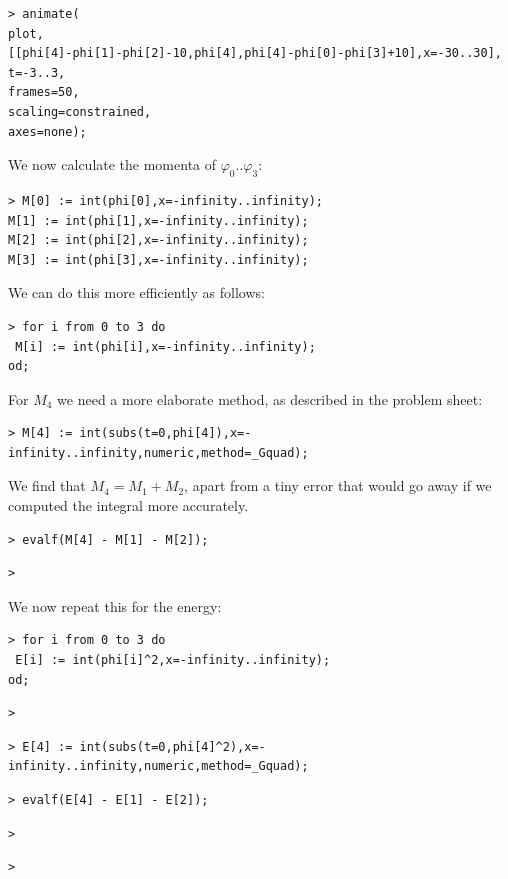 \documentclass{article}
\begin{document}
\begin{lstlisting}
> animate(
plot,
[[phi[4]-phi[1]-phi[2]-10,phi[4],phi[4]-phi[0]-phi[3]+10],x=-30..30],
t=-3..3,
frames=50,
scaling=constrained,
axes=none);
\end{lstlisting}
\begin{Maple Normal}
We now calculate the momenta of 
$\varphi_{0}..\varphi_{3}$:
\end{Maple Normal}
\begin{lstlisting}
> M[0] := int(phi[0],x=-infinity..infinity);
M[1] := int(phi[1],x=-infinity..infinity);
M[2] := int(phi[2],x=-infinity..infinity);
M[3] := int(phi[3],x=-infinity..infinity);
\end{lstlisting}
\begin{Maple Normal}
We can do this more efficiently as follows:
\end{Maple Normal}
\begin{lstlisting}
> for i from 0 to 3 do
 M[i] := int(phi[i],x=-infinity..infinity);
od;
\end{lstlisting}
\begin{Maple Normal}
For 
$M_{4}$ we need a more elaborate method, as described in the problem sheet:
\end{Maple Normal}
\begin{lstlisting}
> M[4] := int(subs(t=0,phi[4]),x=-infinity..infinity,numeric,method=_Gquad);
\end{lstlisting}
\begin{Maple Normal}
We find that 
$M_{4}=M_{1}+M_{2}$, apart from a tiny error that would go away if we computed the integral more accurately.
\end{Maple Normal}
\begin{lstlisting}
> evalf(M[4] - M[1] - M[2]);
\end{lstlisting}
\begin{lstlisting}
> 
\end{lstlisting}
\begin{Maple Normal}
We now repeat this for the energy:
\end{Maple Normal}
\begin{lstlisting}
> for i from 0 to 3 do
 E[i] := int(phi[i]^2,x=-infinity..infinity);
od;
\end{lstlisting}
\begin{lstlisting}
> 
\end{lstlisting}
\begin{lstlisting}
> E[4] := int(subs(t=0,phi[4]^2),x=-infinity..infinity,numeric,method=_Gquad);
\end{lstlisting}
\begin{lstlisting}
> evalf(E[4] - E[1] - E[2]);
\end{lstlisting}
\begin{lstlisting}
> 
\end{lstlisting}
\begin{lstlisting}
> 
\end{lstlisting}
\end{document}
